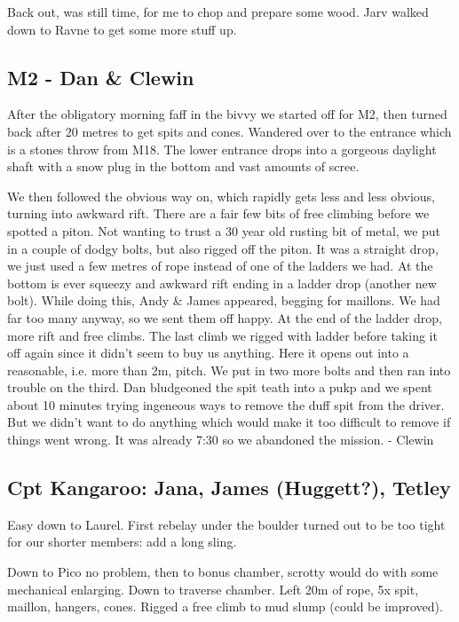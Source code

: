 Back out, was still time, for me to chop and prepare some wood. Jarv
walked down to Ravne to get some more stuff up.

\subsection{M2 - Dan \& Clewin}\label{m2---dan-clewin}

After the obligatory morning faff in the bivvy we started off for M2,
then turned back after 20 metres to get spits and cones. Wandered over
to the entrance which is a stones throw from M18. The lower entrance
drops into a gorgeous daylight shaft with a snow plug in the bottom and
vast amounts of scree.

We then followed the obvious way on, which rapidly gets less and less
obvious, turning into awkward rift. There are a fair few bits of free
climbing before we spotted a piton. Not wanting to trust a 30 year old
rusting bit of metal, we put in a couple of dodgy bolts, but also rigged
off the piton. It was a straight drop, we just used a few metres of rope
instead of one of the ladders we had. At the bottom is ever squeezy and
awkward rift ending in a ladder drop (another new bolt). While doing
this, Andy \& James appeared, begging for maillons. We had far too many
anyway, so we sent them off happy. At the end of the ladder drop, more
rift and free climbs. The last climb we rigged with ladder before taking
it off again since it didn't seem to buy us anything. Here it opens out
into a reasonable, i.e. more than 2m, pitch. We put in two more bolts
and then ran into trouble on the third. Dan bludgeoned the spit teath
into a pukp and we spent about 10 minutes trying ingeneous ways to
remove the duff spit from the driver. But we didn't want to do anything
which would make it too difficult to remove if things went wrong. It was
already 7:30 so we abandoned the mission. - Clewin

\subsection{Cpt Kangaroo: Jana, James (Huggett?),
Tetley}\label{cpt-kangaroo-jana-james-huggett-tetley}

Easy down to Laurel. First rebelay under the boulder turned out to be
too tight for our shorter members: add a long sling.

Down to Pico no problem, then to bonus chamber, scrotty would do with
some mechanical enlarging. Down to traverse chamber. Left 20m of rope,
5x spit, maillon, hangers, cones. Rigged a free climb to mud slump
(could be improved).

